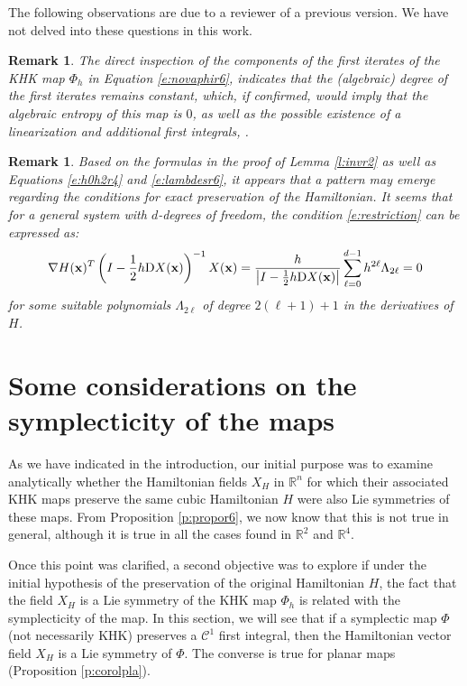 \documentclass[11pt]{article}
\newtheorem {remark} [theorem]{Remark}
\begin{document}
The following observations are due to a reviewer of a previous version. We have not delved into these questions in this work.

\begin{remark}\label{r:referee2a}
The direct inspection of the components of the first iterates of the KHK map $\Phi_h$ in Equation \eqref{e:novaphir6}, indicates that the (algebraic) degree of the first iterates remains constant, which, if confirmed, would imply that the algebraic entropy of this map is $0$, as well as the possible existence of a linearization and additional first integrals, \cite{BV,V}. 
\end{remark}

\begin{remark}\label{r:referee2b} Based on the formulas in the proof of Lemma \ref{l:invr2}  as well as Equations \eqref{e:h0h2r4} and \eqref{e:lambdesr6}, it appears that a pattern may emerge regarding the conditions for exact preservation of the Hamiltonian. It seems that
for a general system with $d$-degrees of freedom, the condition \eqref{e:restriction} can be expressed as:  
$$
\nabla H({\bf{x}})^T \left(I-\frac{1}{2}h{\mathrm D}X({\bf{x}})\right)^{-1}X({\bf{x}})=\frac{h}{\left|I-\frac{1}{2}h {\mathrm D}X({\bf{x}})\right|}\sum_{\ell=0}^{d-1} h^{2\ell}\Lambda_{2\ell}=0
$$
for some suitable polynomials $\Lambda_{2\ell}$ of degree $2(\ell + 1) + 1$ in the derivatives of $H$.  
\end{remark}


\section{Some considerations on the symplecticity of the maps}\label{s:add}

As we have indicated in the introduction, our initial purpose was to examine analytically whether the Hamiltonian fields $X_H$ in $\mathbb{R}^n$ for which their associated KHK maps preserve the same cubic Hamiltonian $H$ were also Lie symmetries of these maps. From Proposition \ref{p:propor6}, we now know that this is not true in general, although it is true in all the cases found in $\mathbb{R}^2$ and $\mathbb{R}^4$.

Once this point was clarified,  a second objective was to explore if under the initial hypothesis of the preservation of the original Hamiltonian $H$, the fact that the field $X_H$ is a Lie symmetry of the
KHK map $\Phi_h$ is related with the symplecticity of the map. In this section, we will see that if a symplectic map $\Phi$ (not  necessarily KHK) preserves a $\mathcal{C}^1$ first integral,  then the Hamiltonian vector field $X_H$ is a Lie symmetry of $\Phi$. The converse is true for planar maps (Proposition \ref{p:corolpla}).
\end{document}
